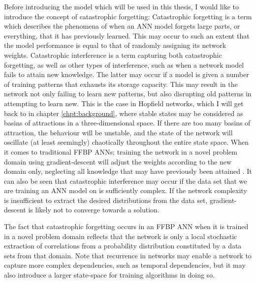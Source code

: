 Before introducing the model which will be used in this thesis, I would like to introduce the concept of catastrophic forgetting:
Catastrophic forgetting \citep{McCloskey1989, Ratcliff1990} is a term which describes the phenomena of when an ANN model forgets large parts, or everything, that it has previously learned. This may occur to such an extent that the model performance is equal to that of randomly assigning its network weights. Catastrophic interference is a term capturing both catastrophic forgetting, as well as other types of interference, such as when a network model fails to attain new knowledge. The latter may occur if a model is given a number of training patterns that exhausts its storage capacity. This may result in the network not only failing to learn new patterns, but also disrupting old patterns in attempting to learn new. This is the case in Hopfield networks, which I will get back to in chapter \ref{chpt:background}, where stable states may be considered as basins of attractions in a three-dimensional space. If there are too many basins of attraction, the behaviour will be unstable, and the state of the network will oscillate (at least seemingly) chaotically throughout the entire state space.
When it comes to traditional FFBP ANNs; training the network in a novel problem domain using gradient-descent will adjust the weights according to the new domain only, neglecting all knowledge that may have previously been attained \citep{McCloskey1989, French1999, French2001}.
It can also be seen that catastrophic interference may occur if the data set that we are training an ANN model on is sufficiently complex. If the network complexity is insufficient to extract the desired distributions from the data set, gradient-descent is likely not to converge towards a solution.

The fact that catastrophic forgetting occurs in an FFBP ANN when it is trained in a novel problem domain reflects that the network is only a local stochastic extraction of correlations from a probability distribution constituted by a data sets from that domain. Note that recurrence in networks may enable a network to capture more complex dependencies, such as temporal dependencies, but it may also introduce a larger state-space for training algorithms in doing so.
\\

